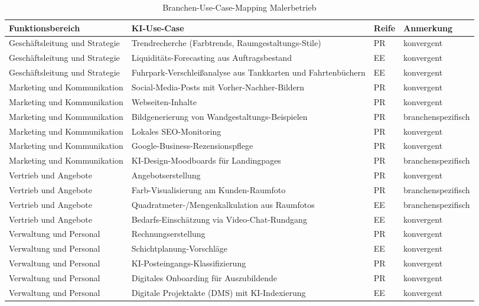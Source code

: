 \documentclass[a4paper,11pt]{article}
\begin{document}
\begin{table}[H]
\centering
\caption{Branchen-Use-Case-Mapping Malerbetrieb}
\label{tab:mapping-maler}
\small
\begin{tabular}{p{3.3cm}p{7.3cm}p{1cm}p{2.5cm}}
\toprule
\textbf{Funktionsbereich} & \textbf{KI-Use-Case} & \textbf{Reife} & \textbf{Anmerkung} \\
\midrule
Geschäftsleitung und Strategie & Trendrecherche (Farbtrends, Raumgestaltungs-Stile) & PR & konvergent \\
Geschäftsleitung und Strategie & Liquiditäts-Forecasting aus Auftragsbestand & EE & konvergent \\
Geschäftsleitung und Strategie & Fuhrpark-Verschleißanalyse aus Tankkarten und Fahrtenbüchern & EE & konvergent \\
Marketing und Kommunikation & Social-Media-Posts mit Vorher-Nachher-Bildern & PR & konvergent \\
Marketing und Kommunikation & Webseiten-Inhalte & PR & konvergent \\
Marketing und Kommunikation & Bildgenerierung von Wandgestaltungs-Beispielen & PR & branchenspezifisch \\
Marketing und Kommunikation & Lokales SEO-Monitoring & PR & konvergent \\
Marketing und Kommunikation & Google-Business-Rezensionspflege & PR & konvergent \\
Marketing und Kommunikation & KI-Design-Moodboards für Landingpages & PR & branchenspezifisch \\
Vertrieb und Angebote & Angebotserstellung & PR & konvergent \\
Vertrieb und Angebote & Farb-Visualisierung am Kunden-Raumfoto & PR & branchenspezifisch \\
Vertrieb und Angebote & Quadratmeter-/Mengenkalkulation aus Raumfotos & EE & branchenspezifisch \\
Vertrieb und Angebote & Bedarfs-Einschätzung via Video-Chat-Rundgang & EE & konvergent \\
Verwaltung und Personal & Rechnungserstellung & PR & konvergent \\
Verwaltung und Personal & Schichtplanung-Vorschläge & EE & konvergent \\
Verwaltung und Personal & KI-Posteingangs-Klassifizierung & PR & konvergent \\
Verwaltung und Personal & Digitales Onboarding für Auszubildende & PR & konvergent \\
Verwaltung und Personal & Digitale Projektakte (DMS) mit KI-Indexierung & EE & konvergent \\

\end{tabular}
\end{table}
\end{document}
